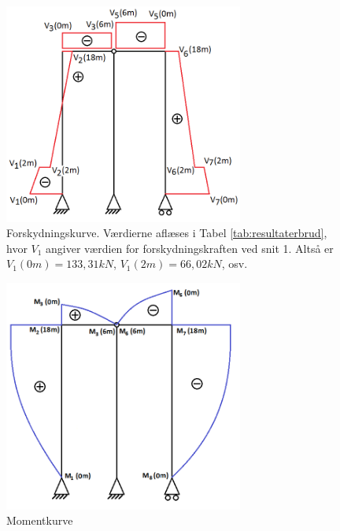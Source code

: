 \begin{figure}[H]
	\centering
	\includegraphics[width=0.7\textwidth]{billeder/sk.png}
	\caption{Forskydningskurve. Værdierne aflæses i Tabel \ref{tab:resultaterbrud}, hvor $V_1$ angiver værdien for forskydningskraften ved snit 1. Altså er $V_1(0m) = 133,31 kN$, $V_1(2m) = 66,02 kN$, osv.}
	\label{fig:forskydningskurve}
\end{figure}

\begin{figure}[H]
	\centering
	\includegraphics[width=0.7\textwidth]{billeder/skkm.png}
	\caption{Momentkurve}
	\label{fig:momentkurve}
\end{figure}

